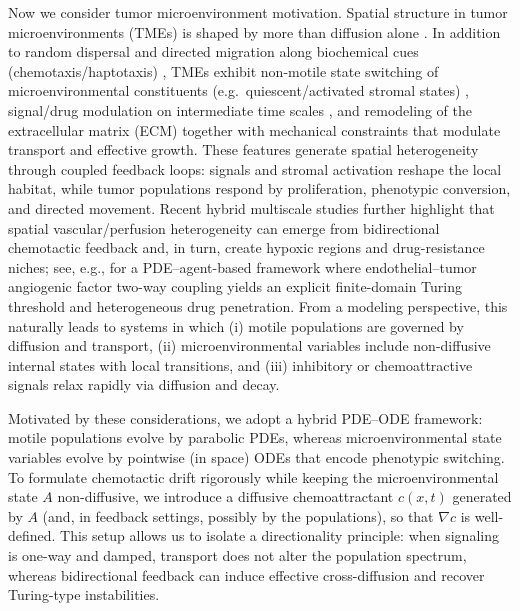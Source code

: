 \documentclass[pdflatex,sn-mathphys-ay]{sn-jnl}
\theoremstyle{thmstyleone}
\theoremstyle{definition}
\theoremstyle{remark}
\begin{document}
Now we consider tumor microenvironment motivation. Spatial structure in tumor microenvironments (TMEs) is shaped by more than diffusion alone \citep{bubba_chemotaxis-based_2019,watts_pdgf-aa_2016,puliafito_three-dimensional_2015,oudin_physical_2016,esfahani_three-dimensional_2022}.
In addition to random dispersal and directed migration along biochemical cues (chemotaxis/haptotaxis) \citep{aznavoorian_signal_1990,taraboletti_thrombospondin-induced_1987}, TMEs exhibit
non-motile state switching of microenvironmental constituents (e.g.\ quiescent/activated stromal states) \citep{arina_tumor-associated_2016,kojima_autocrine_2010,anderberg_paracrine_2009,turlej_cross-talk_2025},
signal/drug modulation on intermediate time scales \citep{issa_dynamics_2025,yu_tumor_2025}, and remodeling of the extracellular matrix (ECM) \citep{henke_extracellular_2020,huang_extracellular_2021,hu_extracellular_2025}
together with mechanical constraints \citep{luu_mechanical_2024} that modulate transport and effective growth.
These features generate spatial heterogeneity through coupled feedback loops: signals and stromal activation reshape the local habitat,
while tumor populations respond by proliferation, phenotypic conversion, and directed movement.
Recent hybrid multiscale studies further highlight that spatial vascular/perfusion heterogeneity can emerge from bidirectional chemotactic feedback and, in turn, create hypoxic regions and drug-resistance niches; see, e.g., \citep{liu_bidirectional_2025} for a PDE--agent-based framework where endothelial--tumor angiogenic factor two-way coupling yields an explicit finite-domain Turing threshold and heterogeneous drug penetration.
From a modeling perspective, this naturally leads to systems in which (i) motile populations are governed by diffusion and transport,
(ii) microenvironmental variables include non-diffusive internal states with local transitions, and (iii) inhibitory or chemoattractive
signals relax rapidly via diffusion and decay.

Motivated by these considerations, we adopt a hybrid PDE--ODE framework: motile populations evolve by parabolic PDEs,
whereas microenvironmental state variables evolve by pointwise (in space) ODEs that encode phenotypic switching.
To formulate chemotactic drift rigorously while keeping the microenvironmental state $A$ non-diffusive, we introduce a diffusive chemoattractant $c(x,t)$ generated by $A$ (and, in feedback settings, possibly by the populations), so that $\nabla c$ is well-defined.
This setup allows us to isolate a directionality principle: when signaling is one-way and damped, transport does not alter the population spectrum,
whereas bidirectional feedback can induce effective cross-diffusion and recover Turing-type instabilities.
\end{document}

